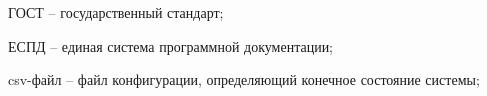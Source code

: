 \newpage
\begin{abbreviations}

ГОСТ -- государственный стандарт;

ЕСПД -- единая система программной документации;

csv-файл -- файл конфигурации, определяющий конечное состояние системы;

\end{abbreviations}
